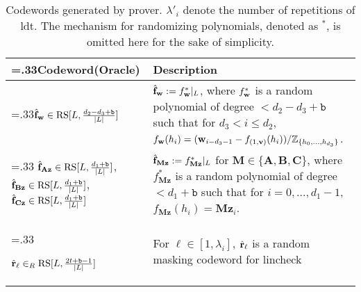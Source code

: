 \begin{table}[]
\centering
\caption[Codewords generated by the Aurora prover algorithm]{Codewords generated by prover. 
$\lambda'_i$ denote the number of repetitions of \gls{ldt}. The mechanism for randomizing polynomials, denoted as $^*$, is omitted here for the sake of simplicity.}
\label{tab:codewords}
{ 
\begin{tabularx}{\linewidth}{>{\hsize=.33\hsize}XX}
\toprule
\textbf{Codeword(Oracle)} & \textbf{Description} \\
\midrule
$\hat{{\bf{f}}}_{\bf{w}} \in \text{RS}[L, \frac{d_2-d_3+\texttt{b}}{|L|}]$  & 
{$\hat{{\bf{f}}}_{\bf{w}} := f^*_{\bf{w}}|_L$, where $f^*_{\bf{w}}$ is a random polynomial of degree $< d_2 - d_3 +\texttt{b}$ such that for $d_3 < i\leq d_2$, \(f_{{\bf{w}}}(h_i) = ({{\bf{w}}_{i-d_3-1} - f_{(1,{\bf{v}})}(h_i)})/{\mathbb{Z}_{\{h_0,\dots, h_{d_3}\}}} \)}.\\     
\midrule
$\hat{{\bf{f}}}_{\mathbf{Az}} \in \text{RS}[L, \frac{d_1+\texttt{b}}{|L|}]$,\newline
$\hat{{\bf{f}}}_{\mathbf{Bz}} \in \text{RS}[L, \frac{d_1+\texttt{b}}{|L|}]$, \newline
$\hat{{\bf{f}}}_{\mathbf{Cz}} \in \text{RS}[L, \frac{d_1+\texttt{b}}{|L|}]$ & 
$\hat{{\bf{f}}}_{\mathbf{Mz}} := f^*_{\mathbf{Mz}}|_L$ for $\mathbf{M} \in \{\mathbf{A}, \mathbf{B}, \mathbf{C}\}$, where $f^*_{\mathbf{Mz}}$ is a random polynomial of degree $< d_1 + \texttt{b}$ such that for $i  = 0, \dots, d_1-1$, \(f_{\mathbf{Mz}}(h_i) = \mathbf{Mz}_i\).
\\
\midrule

$\hat{{\bf{r}}}_\ell \in_R  \text{RS}[L, \frac{2t+\texttt{b}-1}{|L|}]$ & For $\ell\in [1,\lambda_i]$, $\hat{{\bf{r}}}_\ell$ is a random masking codeword for lincheck
\\
\midrule


\end{tabularx}}
\end{table}
